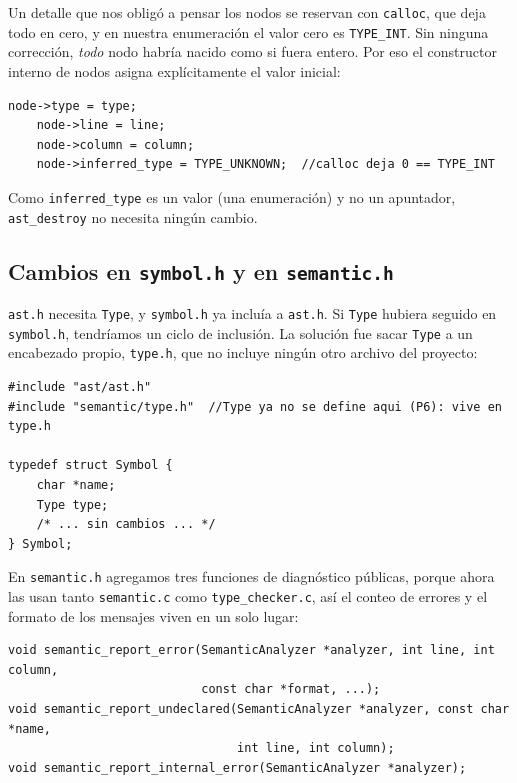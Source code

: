 \documentclass[12pt,letterpaper]{article}
\begin{document}
\bigskip

Un detalle que nos obligó a pensar los nodos se reservan con \texttt{calloc}, que deja todo en cero, y en
nuestra enumeración el valor cero es \texttt{TYPE\_INT}. Sin ninguna corrección, \emph{todo} nodo habría nacido
como si fuera entero. Por eso el constructor interno de nodos asigna explícitamente el valor inicial:

\begin{lstlisting}[style=modernc, caption={Cambio en \texttt{alloc\_node} de \texttt{ast.c}.}]
    node->type = type;
    node->line = line;
    node->column = column;
    node->inferred_type = TYPE_UNKNOWN;  //calloc deja 0 == TYPE_INT
\end{lstlisting}

\bigskip

Como \texttt{inferred\_type} es un valor (una enumeración) y no un apuntador, \texttt{ast\_destroy} no necesita
ningún cambio.

\subsection*{Cambios en \texttt{symbol.h} y en \texttt{semantic.h}}

\texttt{ast.h} necesita \texttt{Type}, y \texttt{symbol.h} ya incluía a \texttt{ast.h}. Si \texttt{Type}
hubiera seguido en \texttt{symbol.h}, tendríamos un ciclo de inclusión. La solución fue sacar \texttt{Type} a
un encabezado propio, \texttt{type.h}, que no incluye ningún otro archivo del proyecto:

\begin{lstlisting}[style=modernc, caption={Cambio en \texttt{symbol.h}: \texttt{Type} ya no se define aquí.}]
#include "ast/ast.h"
#include "semantic/type.h"  //Type ya no se define aqui (P6): vive en type.h

typedef struct Symbol {
    char *name;
    Type type;
    /* ... sin cambios ... */
} Symbol;
\end{lstlisting}

\bigskip

En \texttt{semantic.h} agregamos tres funciones de diagnóstico públicas, porque ahora las usan tanto
\texttt{semantic.c} como \texttt{type\_checker.c}, así el conteo de errores y el formato de los mensajes viven
en un solo lugar:

\begin{lstlisting}[style=modernc, caption={Declaraciones nuevas en \texttt{semantic.h}.}]
void semantic_report_error(SemanticAnalyzer *analyzer, int line, int column,
                           const char *format, ...);
void semantic_report_undeclared(SemanticAnalyzer *analyzer, const char *name,
                                int line, int column);
void semantic_report_internal_error(SemanticAnalyzer *analyzer);
\end{lstlisting}
\end{document}
